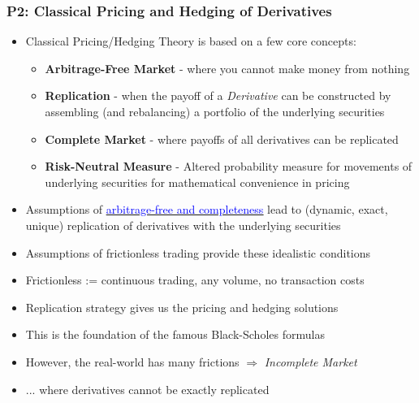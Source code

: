 \documentclass[handout]{beamer}
\begin{document}
\begin{frame}
\frametitle{P2: Classical Pricing and Hedging of Derivatives}
\pause
\begin{itemize}[<+->]
\item Classical Pricing/Hedging Theory is based on a few core concepts:
\begin{itemize}
\item {\bf Arbitrage-Free Market} - where you cannot make money from nothing
\item {\bf Replication} - when the payoff of a {\em Derivative} can be constructed by assembling (and rebalancing) a portfolio of the underlying securities
\item {\bf Complete Market} - where payoffs of all derivatives can be replicated
\item {\bf Risk-Neutral Measure} - Altered probability measure for movements of underlying securities for mathematical convenience in pricing
\end{itemize}
\item Assumptions of \href{https://github.com/coverdrive/technical-documents/blob/master/finance/ArbitrageCompleteness.pdf}{\underline{\textcolor{blue}{arbitrage-free and completeness}}}
lead to (dynamic, exact, unique) replication of derivatives with the underlying securities
\item Assumptions of frictionless trading provide these idealistic conditions
\item Frictionless := continuous trading, any volume, no transaction costs
\item Replication strategy gives us the pricing and hedging solutions
\item This is the foundation of the famous Black-Scholes formulas
\item However, the real-world has many frictions $\Rightarrow$ {\em Incomplete Market}
\item ... where derivatives cannot be exactly replicated
\end{itemize}
\end{frame}
\end{document}
